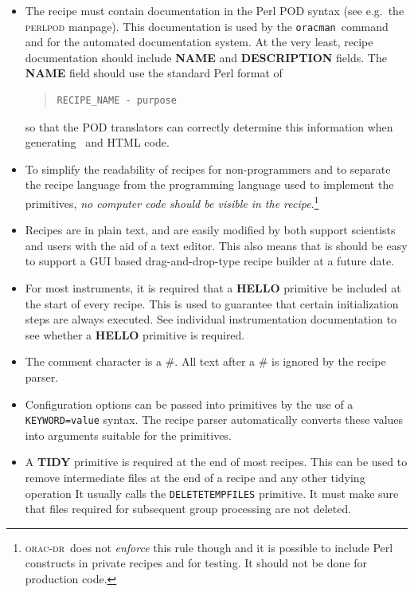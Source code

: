 \documentclass[twoside,11pt]{article}
\newcommand{\latex}[1]{#1}
\renewcommand{\_}{\texttt{\symbol{95}}}
\newcommand{\Oracdr}{\textsc{orac-dr}}
\newcommand{\oracman}{\texttt{oracman}}
\newcommand{\primitive}[1]{{\small\texttt{#1}}}
\newenvironment{myquote}{\begin{quote}\begin{small}}{\end{small}\end{quote}}
\begin{document}
\begin{itemize}
\item The recipe must contain documentation in the Perl POD syntax
(see e.g.\ the \textsc{perlpod} manpage). This documentation is used
by the \oracman\ command and for the automated documentation system.
At the very least, recipe documentation should include \textbf{NAME}
and \textbf{DESCRIPTION} fields. The \textbf{NAME} field should use
the standard Perl format of
\begin{myquote}
\begin{verbatim}
RECIPE_NAME - purpose
\end{verbatim}
\end{myquote}
so that the POD translators can correctly determine this information
when generating \latex\ and HTML code.

\item To simplify the readability of recipes for non-programmers and
to separate the recipe language from the programming language
used to implement the primitives, \emph{no computer code should be visible
in the recipe}.\footnote{\Oracdr\ does not \emph{enforce} this rule
though and it is possible to include Perl constructs in private
recipes and for testing. It should not be done for production code.}

\item Recipes are in plain text, and are easily modified by both support
scientists and users with the aid of a text editor. This also means
that is should be easy to support a GUI based drag-and-drop-type
recipe builder at a future date.

\item For most instruments, it is required that a \textbf{HELLO}
primitive be included at the start of every recipe. This is used 
to guarantee that certain initialization steps are always
executed. See individual instrumentation documentation to see whether
a \textbf{HELLO} primitive is required.

\item The comment character is a \#. All text after a \# is ignored by 
the recipe parser.

\item Configuration options can be passed into primitives by the use
of a \texttt{KEYWORD=value} syntax. The recipe parser automatically
converts these values into arguments suitable for the primitives.


\item A \textbf{TIDY} primitive is required at the end of most
recipes. This can be used to remove intermediate files at the
end of a recipe and any other tidying operation It usually calls the
\primitive{\_DELETE\_TEMP\_FILES\_} primitive. It must make sure that
files required for subsequent group processing are not deleted.


\end{itemize}
\end{document}
